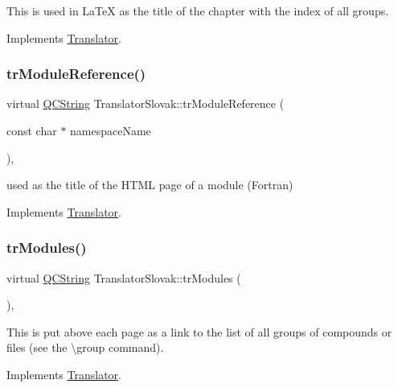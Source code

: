 This is used in La\+TeX as the title of the chapter with the index of all groups. 

Implements \mbox{\hyperlink{class_translator}{Translator}}.

\mbox{\label{class_translator_slovak_a5105b0b1d5f33b2f1f30ecd213a06b39}} 
\subsubsection{\texorpdfstring{trModuleReference()}{trModuleReference()}}
{\footnotesize\ttfamily virtual \mbox{\hyperlink{class_q_c_string}{Q\+C\+String}} Translator\+Slovak\+::tr\+Module\+Reference (\begin{DoxyParamCaption}\item[{const char $\ast$}]{namespace\+Name }\end{DoxyParamCaption})\hspace{0.3cm}{\ttfamily [inline]}, {\ttfamily [virtual]}}

used as the title of the H\+T\+ML page of a module (Fortran) 

Implements \mbox{\hyperlink{class_translator}{Translator}}.

\mbox{\label{class_translator_slovak_aaf321b416d4eafd322032b58becc65e8}} 
\subsubsection{\texorpdfstring{trModules()}{trModules()}}
{\footnotesize\ttfamily virtual \mbox{\hyperlink{class_q_c_string}{Q\+C\+String}} Translator\+Slovak\+::tr\+Modules (\begin{DoxyParamCaption}{ }\end{DoxyParamCaption})\hspace{0.3cm}{\ttfamily [inline]}, {\ttfamily [virtual]}}

This is put above each page as a link to the list of all groups of compounds or files (see the \textbackslash{}group command). 

Implements \mbox{\hyperlink{class_translator}{Translator}}.

